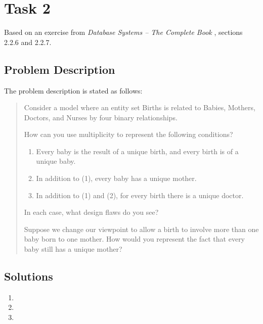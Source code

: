 %
%
%


\section{Task 2}
Based on an exercise from \emph{Database Systems -- The Complete Book}
\cite{2dv513:dbs}, sections 2.2.6 and 2.2.7.

\subsection{Problem Description}
The problem description \cite{2dv513:assignment1-instructions} is stated as
follows:

\begin{quote}
  Consider a model where an entity set Births is related to Babies, Mothers,
  Doctors, and Nurses by four binary relationships.

  How can you use multiplicity to represent the following conditions?

  \begin{enumerate}
    \item
      Every baby is the result of a unique birth, and every birth is of a
      unique baby.
    \item
      In addition to (1), every baby has a unique mother.
    \item
      In addition to (1) and (2), for every birth there is a unique doctor.
  \end{enumerate}

  In each case, what design flaws do you see?

  Suppose we change our viewpoint to allow a birth to involve more than one
  baby born to one mother.
  How would you represent the fact that every baby still has a unique mother?
\end{quote}


\subsection{Solutions}

  \begin{enumerate}
    \item
    \item
    \item
  \end{enumerate}

